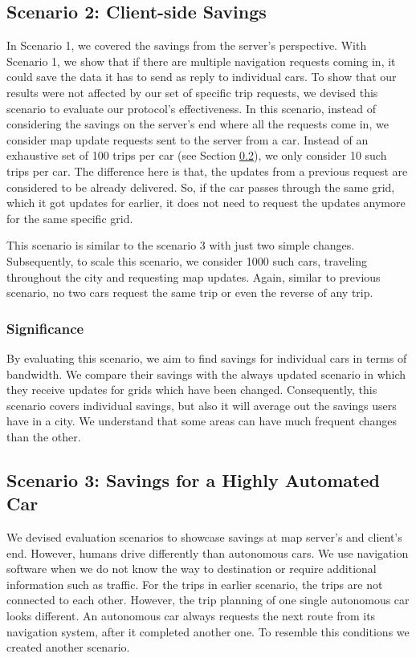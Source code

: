 \subsection{Scenario 2: Client-side Savings} \label{10trips}
In Scenario 1, we covered the savings from the server's perspective. With Scenario 1, we show that if there are multiple navigation requests coming in, it could save the data it has to send as reply to individual cars. To show that our results were not affected by our set of specific trip requests, we devised this scenario to evaluate our protocol's effectiveness. In this scenario, instead of considering the savings on the server's end where all the requests come in, we consider map update requests sent to the server from a car. Instead of an exhaustive set of 100 trips per car (see Section \ref{scenario3}), we only consider 10 such trips per car. The difference here is that, the updates from a previous request are considered to be already delivered. So, if the car passes through the same grid, which it got updates for earlier, it does not need to request the updates anymore for the same specific grid.   

This scenario is similar to the scenario 3 with just two simple changes. Subsequently, to scale this scenario, we consider 1000 such cars, traveling throughout the city and requesting map updates. Again, similar to previous scenario, no two cars request the same trip or even the reverse of any trip.\\

\subsubsection{Significance}
By evaluating this scenario, we aim to find savings for individual cars in terms of bandwidth. We compare their savings with the always updated scenario in which they receive updates for grids which have been changed. Consequently, this scenario covers individual savings, but also it will average out the savings users have in a city. We understand that some areas can have much frequent changes than the other. 


\subsection{Scenario 3: Savings for a Highly Automated Car} \label{scenario3}
We devised evaluation scenarios to showcase savings at map server's and client's end. However, humans drive differently than autonomous cars. We use navigation software when we do not know the way to destination or require additional information such as traffic. For the trips in earlier scenario, the trips are not connected to each other. However, the trip planning of one single autonomous car looks different. An autonomous car always requests the next route from its navigation system, after it completed another one. To resemble this conditions we created another scenario. \\

